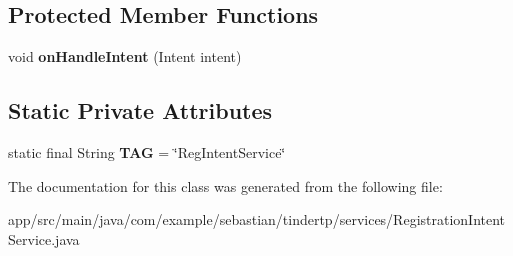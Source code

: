\subsection*{Protected Member Functions}
\begin{DoxyCompactItemize}
\item 
void {\bfseries on\+Handle\+Intent} (Intent intent)\hypertarget{classcom_1_1example_1_1sebastian_1_1tindertp_1_1services_1_1RegistrationIntentService_a3a0277afb1f79d68ee85ce327ec93162}{}\label{classcom_1_1example_1_1sebastian_1_1tindertp_1_1services_1_1RegistrationIntentService_a3a0277afb1f79d68ee85ce327ec93162}

\end{DoxyCompactItemize}
\subsection*{Static Private Attributes}
\begin{DoxyCompactItemize}
\item 
static final String {\bfseries T\+AG} = \char`\"{}Reg\+Intent\+Service\char`\"{}\hypertarget{classcom_1_1example_1_1sebastian_1_1tindertp_1_1services_1_1RegistrationIntentService_ad8ee0e3dc2711e6c7ffc33770ecb2d42}{}\label{classcom_1_1example_1_1sebastian_1_1tindertp_1_1services_1_1RegistrationIntentService_ad8ee0e3dc2711e6c7ffc33770ecb2d42}

\end{DoxyCompactItemize}


The documentation for this class was generated from the following file\+:\begin{DoxyCompactItemize}
\item 
app/src/main/java/com/example/sebastian/tindertp/services/Registration\+Intent\+Service.\+java\end{DoxyCompactItemize}
